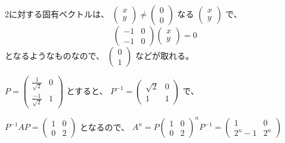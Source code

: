 \documentclass[12pt,a4]{article}
\begin{document}
2に対する固有ベクトルは、
$
\left(
\begin{array}{c}
  x \\
  y
\end{array}
\right)
\neq
\left(
\begin{array}{c}
  0 \\
  0
\end{array}
\right)
$
なる
$
\left(
\begin{array}{c}
  x \\
  y
\end{array}
\right)
$ で、
\begin{equation}
  \begin{pmatrix}
    -1 & 0 \\
    -1 & 0
  \end{pmatrix}
  \left(
  \begin{array}{c}
    x \\
    y
  \end{array}
  \right)
  = 0
\end{equation}
となるようなものなので、
$
\left(
\begin{array}{c}
  0\\
  1
\end{array}
\right)
$
などが取れる。

$ P =
\begin{pmatrix}
  \frac{1}{\sqrt{2}} & 0 \\
  \frac{-1}{\sqrt{2}} & 1
\end{pmatrix}
$
とすると、
$ P^{-1} =
\begin{pmatrix}
  \sqrt{2} & 0 \\
  1 & 1
\end{pmatrix}
$ で、

$ P^{-1} A P =
\begin{pmatrix}
  1 & 0 \\
  0 & 2
\end{pmatrix}
$ となるので、
$
A^n = P \begin{pmatrix}
  1 & 0 \\
  0 & 2
\end{pmatrix}^n P^{-1}
=
\begin{pmatrix}
  1 & 0 \\
  2^n -1 & 2^n
\end{pmatrix}
$

\end{document}
